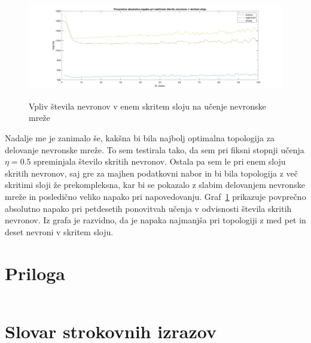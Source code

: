 \documentclass[mat1]{fmfdelo}
\begin{document}
\begin{figure}[!ht]
	\centering
	\includegraphics[width=1\textwidth]{lay.jpg}
	\label{fig:lay}
	\caption{Vpliv števila nevronov v enem skritem sloju na učenje nevronske mreže}
\end{figure}
Nadalje me je zanimalo še, kakšna bi bila najbolj optimalna topologija za delovanje nevronske mreže. To sem testirala tako, da sem pri fiksni stopnji učenja $\eta = 0.5$ spreminjala število skritih nevronov. Ostala pa sem le pri enem sloju skritih nevronov, saj gre za majhen podatkovni nabor in bi bila topologija z več skritimi sloji že prekompleksna, kar bi se pokazalo z slabim delovanjem nevronske mreže in posledično veliko napako pri napovedovanju. 
Graf~\ref{fig:lay} prikazuje povprečno absolutno napako pri petdesetih ponovitvah učenja v odvisnosti števila skritih nevronov. Iz grafa je razvidno, da je napaka najmanjša pri topologiji z med pet in deset nevroni v skritem sloju.


\section{Priloga} \label{priloga}
\inputminted{ocaml}{nevronske_mreze.ml}

\section*{Slovar strokovnih izrazov}
%
\end{document}
